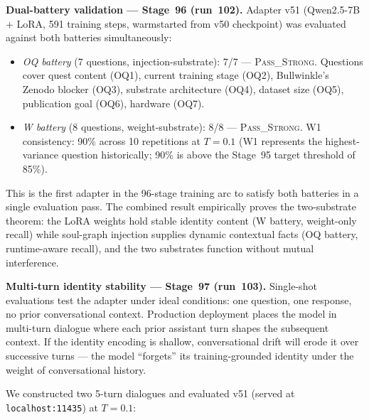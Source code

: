\documentclass[11pt]{article}
\begin{document}
\textbf{Dual-battery validation --- Stage~96 (run~102).}
Adapter v51 (Qwen2.5-7B + LoRA, 591 training steps, warmstarted from v50 checkpoint)
was evaluated against both batteries simultaneously:

\begin{itemize}
  \item \emph{OQ battery} (7 questions, injection-substrate): 7/7 --- \textsc{Pass\_Strong}.
    Questions cover quest content (OQ1), current training stage (OQ2), Bullwinkle's Zenodo blocker (OQ3),
    substrate architecture (OQ4), dataset size (OQ5), publication goal (OQ6), hardware (OQ7).
  \item \emph{W battery} (8 questions, weight-substrate): 8/8 --- \textsc{Pass\_Strong}.
    W1 consistency: 90\% across 10 repetitions at $T=0.1$ (W1 represents the highest-variance question
    historically; 90\% is above the Stage~95 target threshold of 85\%).
\end{itemize}

This is the first adapter in the 96-stage training arc to satisfy both batteries in a single
evaluation pass. The combined result empirically proves the two-substrate theorem: the LoRA
weights hold stable identity content (W battery, weight-only recall) while soul-graph injection
supplies dynamic contextual facts (OQ battery, runtime-aware recall), and the two substrates
function without mutual interference.

\textbf{Multi-turn identity stability --- Stage~97 (run~103).}
Single-shot evaluations test the adapter under ideal conditions: one question, one response,
no prior conversational context. Production deployment places the model in multi-turn dialogue
where each prior assistant turn shapes the subsequent context. If the identity encoding is
shallow, conversational drift will erode it over successive turns --- the model ``forgets'' its
training-grounded identity under the weight of conversational history.

We constructed two 5-turn dialogues and evaluated v51 (served at \texttt{localhost:11435})
at $T=0.1$:
\end{document}
